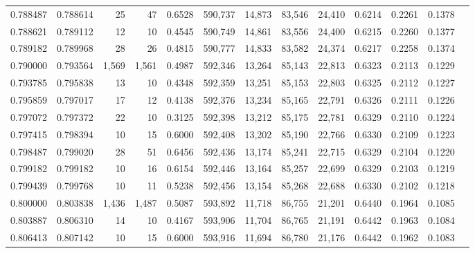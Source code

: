 \begin{tabular}{rrrrrrrrrrrrr}
0.788487 & 0.788614 &     25 &    47 &                                     0.6528 & 590,737 &  14,873 &  83,546 &  24,410 & 0.6214 & 0.2261 & 0.1378 \\
0.788621 & 0.789112 &     12 &    10 &                                     0.4545 & 590,749 &  14,861 &  83,556 &  24,400 & 0.6215 & 0.2260 & 0.1377 \\
0.789182 & 0.789968 &     28 &    26 &                                     0.4815 & 590,777 &  14,833 &  83,582 &  24,374 & 0.6217 & 0.2258 & 0.1374 \\
0.790000 & 0.793564 &  1,569 & 1,561 &                                     0.4987 & 592,346 &  13,264 &  85,143 &  22,813 & 0.6323 & 0.2113 & 0.1229 \\
0.793785 & 0.795838 &     13 &    10 &                                     0.4348 & 592,359 &  13,251 &  85,153 &  22,803 & 0.6325 & 0.2112 & 0.1227 \\
0.795859 & 0.797017 &     17 &    12 &                                     0.4138 & 592,376 &  13,234 &  85,165 &  22,791 & 0.6326 & 0.2111 & 0.1226 \\
0.797072 & 0.797372 &     22 &    10 &                                     0.3125 & 592,398 &  13,212 &  85,175 &  22,781 & 0.6329 & 0.2110 & 0.1224 \\
0.797415 & 0.798394 &     10 &    15 &                                     0.6000 & 592,408 &  13,202 &  85,190 &  22,766 & 0.6330 & 0.2109 & 0.1223 \\
0.798487 & 0.799020 &     28 &    51 &                                     0.6456 & 592,436 &  13,174 &  85,241 &  22,715 & 0.6329 & 0.2104 & 0.1220 \\
0.799182 & 0.799182 &     10 &    16 &                                     0.6154 & 592,446 &  13,164 &  85,257 &  22,699 & 0.6329 & 0.2103 & 0.1219 \\
0.799439 & 0.799768 &     10 &    11 &                                     0.5238 & 592,456 &  13,154 &  85,268 &  22,688 & 0.6330 & 0.2102 & 0.1218 \\
0.800000 & 0.803838 &  1,436 & 1,487 &                                     0.5087 & 593,892 &  11,718 &  86,755 &  21,201 & 0.6440 & 0.1964 & 0.1085 \\
0.803887 & 0.806310 &     14 &    10 &                                     0.4167 & 593,906 &  11,704 &  86,765 &  21,191 & 0.6442 & 0.1963 & 0.1084 \\
0.806413 & 0.807142 &     10 &    15 &                                     0.6000 & 593,916 &  11,694 &  86,780 &  21,176 & 0.6442 & 0.1962 & 0.1083 \\

\end{tabular}
